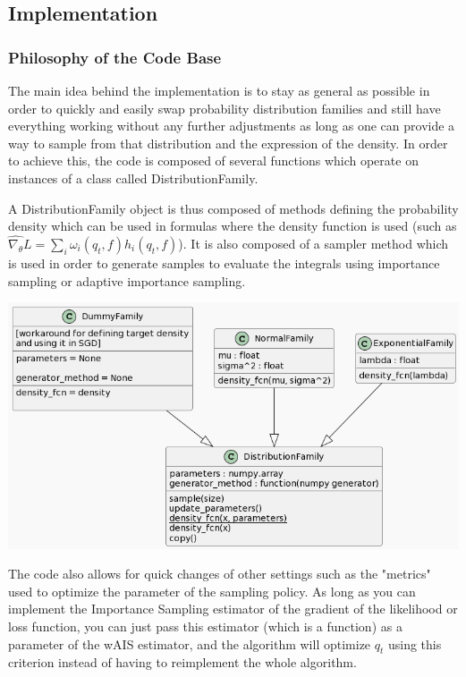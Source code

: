 \subsection{Implementation}

\subsubsection{Philosophy of the Code Base}

The main idea behind the implementation is to stay as general as possible in order to quickly and easily swap probability distribution families and still have everything working without any further adjustments as long as one can provide a way to sample from that distribution and the expression of the density. In order to achieve this, the code is composed of several functions which operate on instances of a class called DistributionFamily. 

A DistributionFamily object is thus composed of methods defining the probability density which can be used in formulas where the density function is used (such as $\widehat{\nabla_\theta}L = \sum_i \omega_i(q_t, f) h_i(q_t, f)$). It is also composed of a sampler method which is used in order to generate samples to evaluate the integrals using importance sampling or adaptive importance sampling.

\includegraphics[width=0.95\linewidth]{Images/code/UML_distribution_family.png}

The code also allows for quick changes of other settings such as the "metrics" used to optimize the parameter of the sampling policy. As long as you can implement the Importance Sampling estimator of the gradient of the likelihood or loss function, you can just pass this estimator (which is a function) as a parameter of the wAIS estimator, and the algorithm will optimize $q_t$ using this criterion instead of having to reimplement the whole algorithm.

